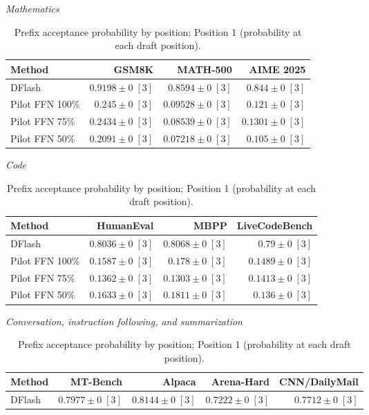 \documentclass[conference,onecolumn]{IEEEtran}
\begin{document}
\begin{table}[!htp]
\centering\small
\setlength{\tabcolsep}{3pt}
\caption{Prefix acceptance probability by position; Position 1 (probability at each draft position).}
\label{tab:appendix-metric-prefix-survival-1}
\textit{Mathematics}\par\smallskip
\begin{tabular}{@{}>{\raggedright\arraybackslash}p{3.7cm}rrr@{}}
\toprule
Method & GSM8K & MATH-500 & AIME 2025 \\
\midrule
DFlash & \(\mathbf{0.9198} \pm 0\;[3]\) & \(\mathbf{0.8594} \pm 0\;[3]\) & \(\mathbf{0.844} \pm 0\;[3]\) \\
Pilot FFN 100\% & \(0.245 \pm 0\;[3]\) & \(0.09528 \pm 0\;[3]\) & \(0.121 \pm 0\;[3]\) \\
Pilot FFN 75\% & \(0.2434 \pm 0\;[3]\) & \(0.08539 \pm 0\;[3]\) & \(0.1301 \pm 0\;[3]\) \\
Pilot FFN 50\% & \(0.2091 \pm 0\;[3]\) & \(0.07218 \pm 0\;[3]\) & \(0.105 \pm 0\;[3]\) \\
\bottomrule
\end{tabular}\par\medskip
\textit{Code}\par\smallskip
\begin{tabular}{@{}>{\raggedright\arraybackslash}p{3.7cm}rrr@{}}
\toprule
Method & HumanEval & MBPP & LiveCodeBench \\
\midrule
DFlash & \(\mathbf{0.8036} \pm 0\;[3]\) & \(\mathbf{0.8068} \pm 0\;[3]\) & \(\mathbf{0.79} \pm 0\;[3]\) \\
Pilot FFN 100\% & \(0.1587 \pm 0\;[3]\) & \(0.178 \pm 0\;[3]\) & \(0.1489 \pm 0\;[3]\) \\
Pilot FFN 75\% & \(0.1362 \pm 0\;[3]\) & \(0.1303 \pm 0\;[3]\) & \(0.1413 \pm 0\;[3]\) \\
Pilot FFN 50\% & \(0.1633 \pm 0\;[3]\) & \(0.1811 \pm 0\;[3]\) & \(0.136 \pm 0\;[3]\) \\
\bottomrule
\end{tabular}\par\medskip
\textit{Conversation, instruction following, and summarization}\par\smallskip
\begin{tabular}{@{}>{\raggedright\arraybackslash}p{3.7cm}rrrr@{}}
\toprule
Method & MT-Bench & Alpaca & Arena-Hard & CNN/DailyMail \\
\midrule
DFlash & \(\mathbf{0.7977} \pm 0\;[3]\) & \(\mathbf{0.8144} \pm 0\;[3]\) & \(\mathbf{0.7222} \pm 0\;[3]\) & \(\mathbf{0.7712} \pm 0\;[3]\) \\

\end{tabular}
\end{table}
\end{document}
